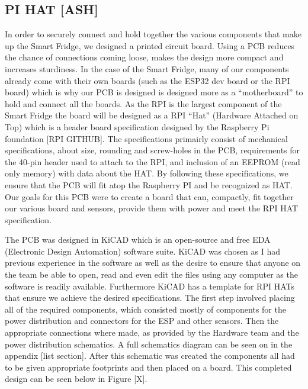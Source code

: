 \subsection{PI HAT [ASH]}

In order to securely connect and hold together the various components that make up the Smart Fridge, we designed a printed circuit board.
Using a PCB reduces the chance of connections coming loose, makes the design more compact and increases sturdiness.
In the case of the Smart Fridge, many of our components already come with their own boards (such as the ESP32 dev board or the RPI board) which is why our PCB is designed is designed more as a “motherboard” to hold and connect all the boards.
As the RPI is the largest component of the Smart Fridge the board will be designed as a RPI “Hat” (Hardware Attached on Top) which is a header board specification designed by the Raspberry Pi foundation [RPI GITHUB].
The specifications primairly consist of mechanical specifications, about size, rounding and screw-holes in the PCB, requirements for the 40-pin header used to attach to the RPI, and inclusion of an EEPROM (read only memory) with data about the HAT.
By following these specifications, we ensure that the PCB will fit atop the Raspberry PI and be recognized as HAT.
Our goals for this PCB were to create a board that can, compactly, fit together our various board and sensors, provide them with power and meet the RPI HAT specification.



The PCB was designed in KiCAD which is an open-source and free EDA (Electronic Design Automation) software suite.
KiCAD was chosen as I had previous experience in the software as well as the desire to ensure that anyone on the team be able to open, read and even edit the files using any computer as the software is readily available.
Furthermore KiCAD has a template for RPI HATs that ensure we achieve the desired specifications.
The first step involved placing all of the required components, which consisted mostly of components for the power distribution and connectors for the ESP and other sensors.
Then the appropriate connections where made, as provided by the Hardware team and the power distribution schematics.
A full schematics diagram can be seen on in the appendix [list section].
After this schematic was created the components all had to be given appropriate footprints and then placed on a board.
This completed design can be seen below in Figure [X].



